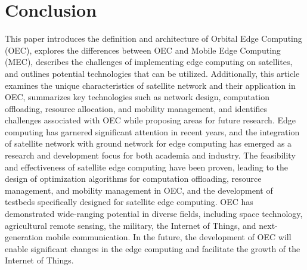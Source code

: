 \documentclass[lettersize,journal]{IEEEtran}
\begin{document}
\section{Conclusion}
This paper introduces the definition and architecture of Orbital Edge Computing (OEC), explores the differences between OEC and Mobile Edge Computing (MEC), describes the challenges of implementing edge computing on satellites, and outlines potential technologies that can be utilized. Additionally, this article examines the unique characteristics of satellite network and their application in OEC, summarizes key technologies such as network design, computation offloading, resource allocation, and mobility management, and identifies challenges associated with OEC while proposing areas for future research.
Edge computing has garnered significant attention in recent years, and the integration of satellite network with ground network for edge computing has emerged as a research and development focus for both academia and industry. The feasibility and effectiveness of satellite edge computing have been proven, leading to the design of optimization algorithms for computation offloading, resource management, and mobility management in OEC, and the development of testbeds specifically designed for satellite edge computing. OEC has demonstrated wide-ranging potential in diverse fields, including space technology, agricultural remote sensing, the military, the Internet of Things, and next-generation mobile communication. In the future, the development of OEC will enable significant changes in the edge computing  and facilitate the growth of the Internet of Things.


{}

\end{document}
